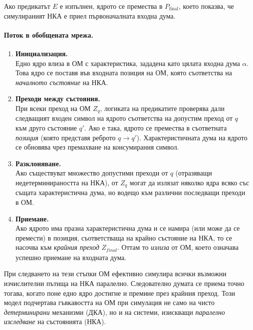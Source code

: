 Ако предикатът $E$ е изпълнен, ядрото се премества в $P_{\text{final}}$, което показва, че симулираният НКА е приел първоначалната входна дума.

\paragraph*{Поток в обобщената мрежа.}
\begin{enumerate}
    \item \textbf{Инициализация.}\\ Едно ядро влиза в ОМ с характеристика, зададена като цялата входна дума \(\alpha\). Това ядро се поставя във входната позиция на ОМ, която съответства на \emph{началното състояние} на НКА.
    
    \item \textbf{Преходи между състояния.}\\ При всеки преход на ОМ \( Z_q \), логиката на предикатите проверява дали следващият входен символ на ядрото съответства на допустим преход от \( q \) към друго състояние \( q' \). Ако е така, ядрото се премества в съответната \emph{позиция} (която представя реброто \( q \rightarrow q' \)). Характеристичната дума на ядрото се обновява чрез премахване на консумирания символ.
    
    \item \textbf{Разклоняване.}\\ Ако съществуват множество допустими преходи от \( q \) (отразяващи недетерминираността на НКА), от \( Z_q \) могат да излязат няколко ядра  всяко със същата характеристична дума, но водещо към различни последващи преходи в ОМ.
    
    \item \textbf{Приемане.}\\ Ако ядрото има празна характеристична дума и се намира (или може да се премести) в позиция, съответстваща на крайно състояние на НКА, то се насочва към \emph{крайния преход} \( Z_{\mathit{final}} \). Оттам то \emph{излиза} от ОМ, което означава успешно приемане на входната дума.
\end{enumerate}
\hspace*{2.5em}При следването на тези стъпки ОМ ефективно симулира всички възможни изчислителни пътища на НКА паралелно. Следователно думата се приема точно тогава, когато поне едно ядро достигне и премине през крайния преход. Този модел подчертава гъвкавостта на ОМ при симулация не само на чисто \emph{детерминирани} механизми (ДКА), но и на системи, изискващи \emph{паралелно изследване} на състоянията (НКА).

